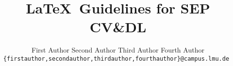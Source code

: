 \documentclass[10pt,twocolumn,letterpaper]{article}
\title{\LaTeX\ Guidelines for SEP CV\&DL}
\author{First Author
\quad
Second Author
\quad
Third Author
\quad
Fourth Author\\
\tt\small\{firstauthor,secondauthor,thirdauthor,fourthauthor\}@campus.lmu.de
}
\begin{document}
\maketitle
    


{
    \small
    
    
}

% 
\end{document}
